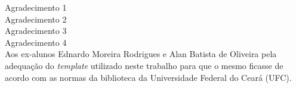 
Agradecimento 1\\

Agradecimento 2\\

Agradecimento 3\\

Agradecimento 4\\




Aos ex-alunos Ednardo Moreira Rodrigues e Alan Batista de Oliveira pela adequação do \textit{template} utilizado neste trabalho para que o mesmo ficasse de acordo com as normas da biblioteca da Universidade Federal do Ceará (UFC).